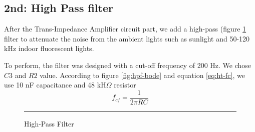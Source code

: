 \subsection{2nd: High Pass filter}

After the Trans-Impedance Amplifier circuit part, we add a high-pass (figure \ref{fig:hpf} filter to attenuate the noise from the ambient lights such as sunlight and 50-120 kHz indoor fluorescent lights.

To perform, the filter was designed with a cut-off frequency of 200 Hz. We chose $C3$ and $R2$ value. According to figure \ref{fig:hpf-bode} and equation \ref{eq:ht-fc}, we use 10 nF capacitance and 48 kH$\Omega$ resistor
\begin{equation}
f_{cf}  = \frac{1}{2\pi RC}
\label{eq:ht-fc}
\end{equation}

\begin{figure}[htbp]
    \centering
    \rule{35em}{0.5pt}
    \caption{High-Pass Filter}
    \label{fig:hpf}
\end{figure}

